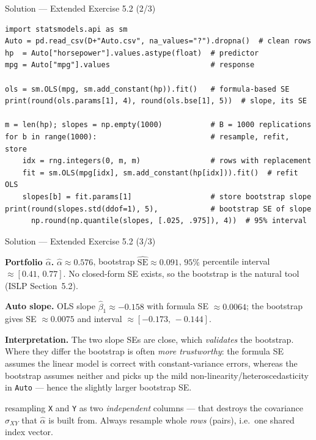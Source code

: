 \documentclass[aspectratio=169,11pt]{beamer}
\begin{document}
\begin{frame}[fragile]{Solution --- Extended Exercise 5.2 (2/3)}
  \begin{lstlisting}
import statsmodels.api as sm
Auto = pd.read_csv(D+"Auto.csv", na_values="?").dropna()  # clean rows
hp  = Auto["horsepower"].values.astype(float)  # predictor
mpg = Auto["mpg"].values                       # response

ols = sm.OLS(mpg, sm.add_constant(hp)).fit()   # formula-based SE
print(round(ols.params[1], 4), round(ols.bse[1], 5))  # slope, its SE

m = len(hp); slopes = np.empty(1000)           # B = 1000 replications
for b in range(1000):                          # resample, refit, store
    idx = rng.integers(0, m, m)                # rows with replacement
    fit = sm.OLS(mpg[idx], sm.add_constant(hp[idx])).fit()  # refit OLS
    slopes[b] = fit.params[1]                  # store bootstrap slope
print(round(slopes.std(ddof=1), 5),            # bootstrap SE of slope
      np.round(np.quantile(slopes, [.025, .975]), 4))  # 95% interval
  \end{lstlisting}
\end{frame}

\begin{frame}{Solution --- Extended Exercise 5.2 (3/3)}
  \begin{solutionbox}
    \textbf{Portfolio $\hat\alpha$.} $\hat\alpha\approx 0.576$, bootstrap
    $\widehat{\mathrm{SE}}\approx 0.091$, $95\%$ percentile interval
    $\approx[0.41,\,0.77]$. No closed-form SE exists, so the bootstrap is
    the natural tool (ISLP Section~5.2).

    \textbf{Auto slope.} OLS slope $\hat\beta_1\approx -0.158$ with
    formula SE $\approx 0.0064$; the bootstrap gives SE $\approx 0.0075$
    and interval $\approx[-0.173,\,-0.144]$.

    \textbf{Interpretation.} The two slope SEs are close, which
    \emph{validates} the bootstrap. Where they differ the bootstrap is
    often \emph{more trustworthy}: the formula SE assumes the linear
    model is correct with constant-variance errors, whereas the
    bootstrap assumes neither and picks up the mild
    non-linearity/heteroscedasticity in \texttt{Auto} --- hence the
    slightly larger bootstrap SE.
  \end{solutionbox}
  \begin{mistake}
    resampling \texttt{X} and \texttt{Y} as two
    \emph{independent} columns --- that destroys the covariance
    $\hat\sigma_{XY}$ that $\hat\alpha$ is built from. Always resample
    whole \emph{rows} (pairs), i.e.\ one shared index vector.
  \end{mistake}
\end{frame}
\end{document}
